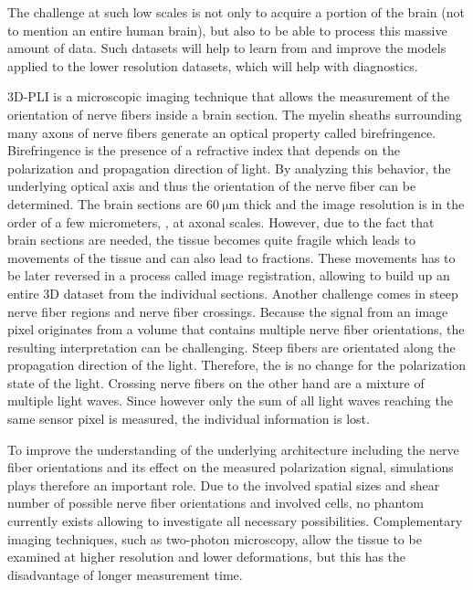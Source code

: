 The challenge at such low scales is not only to acquire a portion of the brain (not to mention an entire human brain), but also to be able to process this massive amount of data.
Such datasets will help to learn from and improve the models applied to the lower resolution datasets, which will help with \eg{} diagnostics. \\
\cite{MaierHein2017, Schilling2021, Yendiki2021, Costantini2021}
\par
% 
\ac{3D-PLI} is a microscopic imaging technique that allows the measurement of the orientation of nerve fibers inside a brain section.
The myelin sheaths surrounding many axons of nerve fibers generate an optical property called birefringence.
Birefringence is the presence of a refractive index that depends on the polarization and propagation direction of light.
By analyzing this behavior, the underlying optical axis and thus the orientation of the nerve fiber can be determined.
The brain sections are $\SI{60}{\micro\meter}$ thick and the image resolution is in the order of a few micrometers, \ie{}, at axonal scales.
However, due to the fact that brain sections are needed, the tissue becomes quite fragile which leads to movements of the tissue and can also lead to fractions.
These movements has to be later reversed in a process called image registration, allowing to build up an entire 3D dataset from the individual sections.
Another challenge comes in steep nerve fiber regions and nerve fiber crossings.
Because the signal from an image pixel originates from a volume that contains multiple nerve fiber orientations, the resulting interpretation can be challenging.
Steep fibers are \eg{} orientated along the propagation direction of the light.
Therefore, the is no change for the polarization state of the light.
Crossing nerve fibers on the other hand are a mixture of multiple light waves.
Since however only the sum of all light waves reaching the same sensor pixel is measured, the individual information is lost. \\ 
\cite{Axer2011a, Axer2011, Axer2016}
\par
% 
To improve the understanding of the underlying architecture including the nerve fiber orientations and its effect on the measured polarization signal, simulations plays therefore an important role.
Due to the involved spatial sizes and shear number of possible nerve fiber orientations and involved cells, no phantom currently exists allowing to investigate all necessary possibilities.
Complementary imaging techniques, such as two-photon microscopy, allow the tissue to be examined at higher resolution and lower deformations, but this has the disadvantage of longer measurement time.
